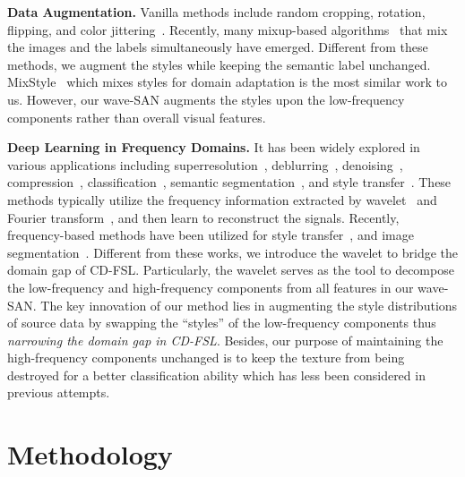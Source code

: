 \documentclass{article}
\begin{document}
\noindent \textbf{Data Augmentation.}
Vanilla methods include random cropping, rotation, flipping, and color jittering~\cite{krizhevsky2012imagenet,zeiler2014visualizing,chen2020simple}. Recently, many mixup-based algorithms~\cite{zhang2017mixup,verma2019manifold,yun2019cutmix} that mix the images and the labels simultaneously have emerged. Different from these methods, we augment the styles while keeping the semantic label unchanged. MixStyle~\cite{zhou2021domain} which mixes styles for domain adaptation is the most similar work to us. However, our wave-SAN augments the styles upon the low-frequency components rather than overall visual features.



\noindent\textbf{Deep Learning in Frequency Domains.} 
It has been widely explored in various applications 
including superresolution~\cite{bae2017beyond,guo2017deep,liu2018multi,deng2019wavelet}, deblurring~\cite{zou2021sdwnet,min2018blind,gao2019dynamic}, denoising~\cite{kang2018deep}, compression~\cite{levinskis2013convolutional,gueguen2018faster}, classification~\cite{fujieda2017wavelet,ryu2018dft,williams2018wavelet},  semantic segmentation~\cite{yang2020fda,liu2020remove},  and style transfer~\cite{yoo2019photorealistic,jamadandi2019exemplar,ding2022deep,singh2021safin}. These methods typically utilize the frequency information extracted by wavelet~\cite{wu2012eulerian,zhang1992wavelet} and Fourier transform~\cite{bracewell1986fourier}, and then learn to reconstruct the signals. 
Recently, frequency-based methods have been utilized for style transfer~\cite{yoo2019photorealistic}, and image segmentation~\cite{yang2020fda}. Different from these works, we introduce the wavelet to bridge the domain gap of CD-FSL. Particularly,  the wavelet serves as the tool to decompose the low-frequency and high-frequency components from all features in our wave-SAN. 
The key innovation of our method lies in augmenting the style distributions of source data by swapping the “styles” of the low-frequency components thus \textit{narrowing the domain gap in CD-FSL}. Besides, our purpose of maintaining the high-frequency components unchanged is to keep the texture from being destroyed for a better classification ability which has less been considered in previous attempts. 






\section{Methodology}
\end{document}
